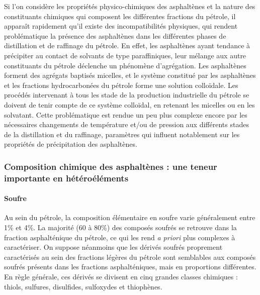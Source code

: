 \documentclass[12pt,a4paper]{book}
\begin{document}
Si l'on considère les propriétés physico-chimiques des asphaltènes et la nature des constituants chimiques qui composent les différentes fractions du pétrole, il apparaît rapidement qu'il existe des incompatibilités physiques, qui rendent problématique la présence des asphaltènes dans les différentes phases de distillation et de raffinage du pétrole. En effet, les asphaltènes ayant tendance à précipiter au contact de solvants de type paraffiniques, leur mélange aux autre constituants du pétrole déclenche un phénomène d'agrégation. Les asphaltènes forment des agrégats baptisés micelles, et le système constitué par les asphaltènes et les fractions hydrocarbonées du pétrole forme une solution colloïdale. Les procédés intervenant à tous les stade de la production industrielle du pétrole se doivent de tenir compte de ce système colloïdal, en retenant les micelles ou en les solvatant. Cette problématique est rendue un peu plus complexe encore par les nécessaires changements de température et/ou de pression aux différents stades de la distillation et du raffinage, paramètres qui influent notablement sur les propriétés de précipitation des asphaltènes. 

\subsubsection{Composition chimique des asphaltènes : une teneur importante en hétéroéléments}

\paragraph{Soufre}

Au sein du pétrole, la composition élémentaire en soufre varie généralement entre 1\% et 4\%. La majorité (60 à 80\%) des composés soufrés se retrouve dans la fraction asphalténique du pétrole, ce qui les rend \textit{a priori} plus complexes à caractériser. On suppose néanmoins que les dérivés soufrés proprement caractérisés au sein des fractions légères du pétrole sont semblables aux composés soufrés présents dans les fractions asphalténiques, mais en proportions différentes. 
En règle générale, ces dérivés se divisent en cinq grandes classes chimiques : thiols, sulfures, disulfides, sulfoxydes et thiophènes. 
\end{document}
